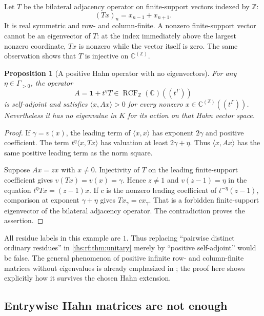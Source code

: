 \documentclass[11pt,a4paper]{article}
\numberwithin{equation}{section}
\newtheorem{proposition}[proposition]{Proposition}
\theoremstyle{definition}
\theoremstyle{remark}
\newcommand{\C}{\mathbb C}
\newcommand{\Z}{\mathbb Z}
\newcommand{\K}{K}
\newcommand{\RCF}{\operatorname{RCF}}
\newcommand{\Id}{\mathbf 1}
\newcommand{\ip}[2]{\langle#1,#2\rangle}
\begin{document}
Let $T$ be the bilateral adjacency operator on finite-support vectors
indexed by $\Z$:
\[
 (Tx)_n=x_{n-1}+x_{n+1}.
\]
It is real symmetric and row- and column-finite. A nonzero finite-support
vector cannot be an eigenvector of $T$: at the index immediately above the
largest nonzero coordinate, $Tx$ is nonzero while the vector itself is zero.
The same observation shows that $T$ is injective on $\C^{(\Z)}$.

\begin{proposition}[A positive Hahn operator with no eigenvectors]\label{ihs:rf:prop:degenerate}
For any $\eta\in\Gamma_{>0}$, the operator
\[
 A=\Id+t^\eta T\in\RCF_{\Z}(\C)((t^\Gamma))
\]
is self-adjoint and satisfies $\ip{x}{Ax}>0$ for every nonzero
$x\in\C^{(\Z)}((t^\Gamma))$. Nevertheless it has no eigenvalue in $\K$ for
its action on that Hahn vector space.
\end{proposition}
\begin{proof}
If $\gamma=v(x)$, the leading term of $\ip{x}{x}$ has exponent $2\gamma$ and
positive coefficient. The term $t^\eta\ip{x}{Tx}$ has valuation at least
$2\gamma+\eta$. Thus $\ip{x}{Ax}$ has the same positive leading term as the
norm square.

Suppose $Ax=zx$ with $x\ne0$. Injectivity of $T$ on the leading
finite-support coefficient gives $v(Tx)=v(x)=\gamma$. Hence $z\ne1$ and
$v(z-1)=\eta$ in the equation $t^\eta Tx=(z-1)x$. If $c$ is the nonzero
leading coefficient of $t^{-\eta}(z-1)$, comparison at exponent
$\gamma+\eta$ gives $Tx_\gamma=cx_\gamma$. That is a forbidden
finite-support eigenvector of the bilateral adjacency operator. The
contradiction proves the assertion.
\end{proof}

All residue labels in this example are $1$. Thus replacing ``pairwise
distinct ordinary residues'' in \cref{ihs:rf:thm:unitary} merely by
``positive self-adjoint'' would be false. The general phenomenon of positive
infinite row- and column-finite matrices without eigenvalues is already
emphasized in \cite{ago}; the proof here shows explicitly how it survives
the chosen Hahn extension.

\subsection{Entrywise Hahn matrices are not enough}\label{ihs:rf:sec:incoherent}
\end{document}
